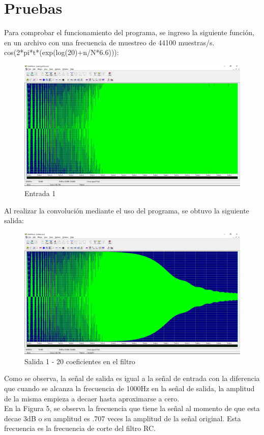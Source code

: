 \section{Pruebas}
Para comprobar el funcionamiento del programa, se ingreso la siguiente función, en un archivo con una frecuencia de muestreo de 44100 muestras/s. \\ cos(2*pi*t*(exp(log(20)+n/N*6.6))):
\begin{figure}[H]
	\centering
	\includegraphics[scale=.35]{img/entrada1.png}
	\caption{Entrada 1}
	\label{fig:prueba1}		
\end{figure}
Al realizar la convolución mediante el uso del programa, se obtuvo la siguiente salida:
\begin{figure}[H]
	\centering
	\includegraphics[scale=.35]{img/salida1.png}
	\caption{Salida 1 - 20 coeficientes en el filtro}
	\label{fig:salida1}		
\end{figure}
Como se observa, la señal de salida es igual a la señal de entrada con la diferencia que cuando se alcanza la frecuencia de 1000Hz en la señal de salida, la amplitud de la misma empieza a decaer hasta aproximarse a cero.\\ En la Figura 5, se observa la frecuencia que tiene la señal al momento de que esta decae 3dB o su amplitud es .707 veces la amplitud de la señal original. Esta frecuencia es la frecuencia de corte del filtro RC.
